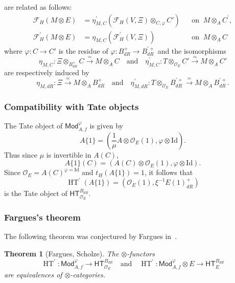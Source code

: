 \documentclass[11pt]{article}
\newtheorem{theo}{Theorem}[section]
\theoremstyle{definition}
\numberwithin{equation}{section}
\numberwithin{figure}{section}
\numberwithin{table}{section}
\newcommand{\Mod}{\mathsf{Mod}}
\newcommand{\HT}{\mathsf{HT}}
\DeclareMathOperator{\HTT}{HT}
\newcommand*{\dR}{dR}
\begin{document}
are related as follows:
\[
\begin{aligned}
\mathcal{F}_{H}(M\otimes E) & = \eta_{M,C}^{\prime}\left(\mathcal{F}_{H}(V,\Xi)\otimes_{C,\varphi}C'\right) && \text{on}\;\; M\otimes_{A}C^{\prime},\\
\mathcal{F}_{H}^{\prime}(M\otimes E) & = \eta_{M,C}\left(\mathcal{F}_{H}^{\prime}(V,\Xi)\right) && \text{on}\;\; M\otimes_{A}C
\end{aligned}
\]
where $\varphi:C\rightarrow C'$ is the residue of $\varphi:B_{\dR}^{+}\rightarrow B_{\dR}^{\prime+}$ and the isomorphisms
\[
\eta_{M,C}:\Xi\otimes_{B_{\dR}^{+}}C\stackrel{\simeq}{\longrightarrow}M\otimes_{A}C\quad\text{and}\quad\eta_{M,C}^{\prime}:T\otimes_{\mathcal{O}_{E}}C'\stackrel{\simeq}{\longrightarrow}M\otimes_{A}C'
\]
are respectively induced by
\[
\eta_{M,\dR}:\Xi\stackrel{\simeq}{\longrightarrow}M\otimes_{A}B_{\dR}^{+}\quad\text{and}\quad\eta_{M,\dR}^{\prime}:T\otimes_{\mathcal{O}_{E}}B_{\dR}^{\prime+}\stackrel{\simeq}{\longrightarrow}M\otimes_{A}B_{\dR}^{\prime+}.
\]


\subsubsection{Compatibility with Tate objects}

The Tate object of $\Mod_{A,f}^{\varphi}$ is given by
\[
A\{1\}=\left({\frac{1}{\mu}}A\otimes\mathcal{O}_{E}(1),\varphi\otimes\mathrm{Id}\right).
\]
Thus since $\mu$ is invertible in $A(C)$,
\[
A\{1\}(C)=\left(A(C)\otimes\mathcal{O}_{E}(1),\varphi\otimes\mathrm{Id}\right).
\]
Since $\mathcal{O}_{E}=A(C)^{\varphi=\mathrm{Id}}$ and $t_{H}(A\{1\})=1$, it follows that
\[
\HTT^{\prime}\left(A\{1\}\right)=(\mathcal{O}_{E}(1),\xi^{-1}E(1)_{\dR}^{+})
\]
is the Tate object of $\HT_{\mathcal{O}_{E}}^{B_{\dR}}$.

\subsubsection{Fargues's theorem}\label{subsec:Fargue's-theorem}

The following theorem was conjectured by Fargues in~\cite{Fa15}.

\begin{theo}[Fargues, Scholze]\label{thm:FarguesScholze}
The $\otimes$-functors
\[
\HTT^{\prime}:\Mod_{A,f}^{\varphi}\rightarrow\HT_{\mathcal{O}_{E}}^{B_{\dR}}\quad\text{and}\quad\HTT^{\prime}:\Mod_{A,f}^{\varphi}\otimes E\rightarrow\HT_{E}^{B_{\dR}}
\]
are equivalences of $\otimes$-categories.
\end{theo}
\end{document}
